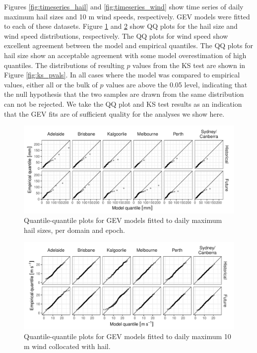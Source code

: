 \documentclass[]{agujournal2019}\usepackage[]{graphicx}\usepackage[]{xcolor}
\begin{document}
Figures \ref{fig:timeseries_hail} and \ref{fig:timeseries_wind} show time series of daily maximum hail sizes and 10 m wind speeds, respectively. GEV models were fitted to each of these datasets. Figure \ref{fig:qq_hail} and \ref{fig:qq_wind} show QQ plots for the hail size and wind speed distributions, respectively. The QQ plots for wind speed show excellent agreement between the model and empirical quantiles. The QQ plots for hail size show an acceptable agreement with some model overestimation of high quantiles. The distributions of resulting $p$ values from the KS test are shown in Figure \ref{fig:ks_pvals}. In all cases where the model was compared to empirical values, either all or the bulk of $p$ values are above the 0.05 level, indicating that the null hypothesis that the two samples are drawn from the same distribution can not be rejected. We take the QQ plot and KS test results as an indication that the GEV fits are of sufficient quality for the analyses we show here. 

\begin{figure}[!ht]
      \includegraphics[width=\textwidth]{figures/qq_hail}
      \caption{Quantile-quantile plots for GEV models fitted to daily maximum hail sizes, per domain and epoch.}
      \label{fig:qq_hail}
\end{figure}

\begin{figure}[!ht]
      \includegraphics[width=\textwidth]{figures/qq_wind}
      \caption{Quantile-quantile plots for GEV models fitted to daily maximum 10 m wind collocated with hail.}
      \label{fig:qq_wind}
\end{figure}
 
\end{document}
